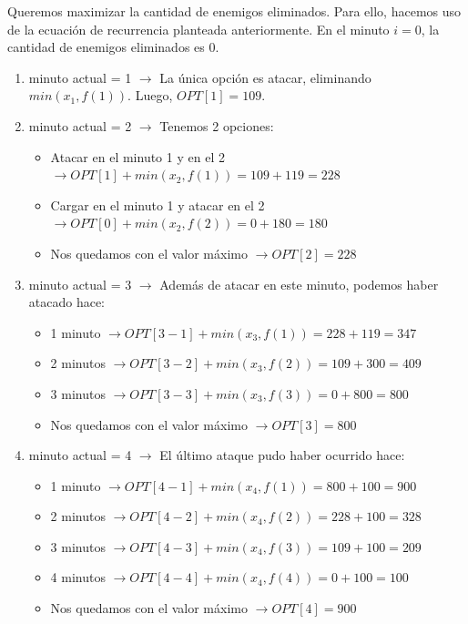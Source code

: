 \documentclass{article}
\begin{document}
Queremos maximizar la cantidad de enemigos eliminados. Para ello, hacemos uso de la ecuación de recurrencia planteada anteriormente. En el minuto $i = 0$, la cantidad de enemigos eliminados es 0.
\begin{enumerate}
    \item minuto actual = 1 $\rightarrow$ La única opción es atacar, eliminando $min(x_1, f(1))$. Luego, $OPT[1] = 109$.
    \item minuto actual = 2 $\rightarrow$ Tenemos 2 opciones:
    \begin{itemize}
        \item Atacar en el minuto 1 y en el 2 $\rightarrow OPT[1] + min(x_2, f(1)) = 109 + 119 = 228$
        \item Cargar en el minuto 1 y atacar en el 2 $\rightarrow OPT[0] + min(x_2, f(2)) = 0 + 180 = 180$
        \item Nos quedamos con el valor máximo $\rightarrow OPT[2] = 228$     
    \end{itemize}
    \item minuto actual = 3 $\rightarrow$ Además de atacar en este minuto, podemos haber atacado hace:
    \begin{itemize}
        \item 1 minuto $\rightarrow OPT[3-1] + min(x_3, f(1)) = 228 + 119 = 347$
        \item 2 minutos $\rightarrow OPT[3-2] + min(x_3, f(2)) = 109 + 300 = 409$
        \item 3 minutos $\rightarrow OPT[3-3] + min(x_3, f(3)) = 0 + 800 = 800$
        \item Nos quedamos con el valor máximo $\rightarrow OPT[3] = 800$     
    \end{itemize}
    \item minuto actual = 4 $\rightarrow$ El último ataque pudo haber ocurrido hace:
    \begin{itemize}
        \item 1 minuto $\rightarrow OPT[4-1] + min(x_4, f(1)) = 800 + 100 = 900$
        \item 2 minutos $\rightarrow OPT[4-2] + min(x_4, f(2)) = 228 + 100 = 328$
        \item 3 minutos $\rightarrow OPT[4-3] + min(x_4, f(3)) = 109 + 100 = 209$
        \item 4 minutos $\rightarrow OPT[4-4] + min(x_4, f(4)) = 0 + 100 = 100$
        \item Nos quedamos con el valor máximo $\rightarrow OPT[4] = 900$     
    \end{itemize}

\end{enumerate}
\end{document}
